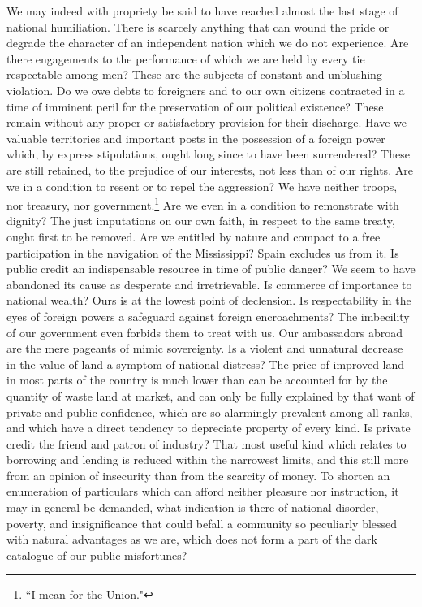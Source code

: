 We may indeed with propriety be said to have reached almost the last stage of national humiliation. There is scarcely anything that can wound the pride or degrade the character of an independent nation which we do not experience. Are there engagements to the performance of which we are held by every tie respectable among men? These are the subjects of constant and unblushing violation. Do we owe debts to foreigners and to our own citizens contracted in a time of imminent peril for the preservation of our political existence? These remain without any proper or satisfactory provision for their discharge. Have we valuable territories and important posts in the possession of a foreign power which, by express stipulations, ought long since to have been surrendered? These are still retained, to the prejudice of our interests, not less than of our rights. Are we in a condition to resent or to repel the aggression? We have neither troops, nor treasury, nor government.\footnote{``I mean for the Union."} Are we even in a condition to remonstrate with dignity? The just imputations on our own faith, in respect to the same treaty, ought first to be removed. Are we entitled by nature and compact to a free participation in the navigation of the Mississippi? Spain excludes us from it. Is public credit an indispensable resource in time of public danger? We seem to have abandoned its cause as desperate and irretrievable. Is commerce of importance to national wealth? Ours is at the lowest point of declension. Is respectability in the eyes of foreign powers a safeguard against foreign encroachments? The imbecility of our government even forbids them to treat with us. Our ambassadors abroad are the mere pageants of mimic sovereignty. Is a violent and unnatural decrease in the value of land a symptom of national distress? The price of improved land in most parts of the country is much lower than can be accounted for by the quantity of waste land at market, and can only be fully explained by that want of private and public confidence, which are so alarmingly prevalent among all ranks, and which have a direct tendency to depreciate property of every kind. Is private credit the friend and patron of industry? That most useful kind which relates to borrowing and lending is reduced within the narrowest limits, and this still more from an opinion of insecurity than from the scarcity of money. To shorten an enumeration of particulars which can afford neither pleasure nor instruction, it may in general be demanded, what indication is there of national disorder, poverty, and insignificance that could befall a community so peculiarly blessed with natural advantages as we are, which does not form a part of the dark catalogue of our public misfortunes?

